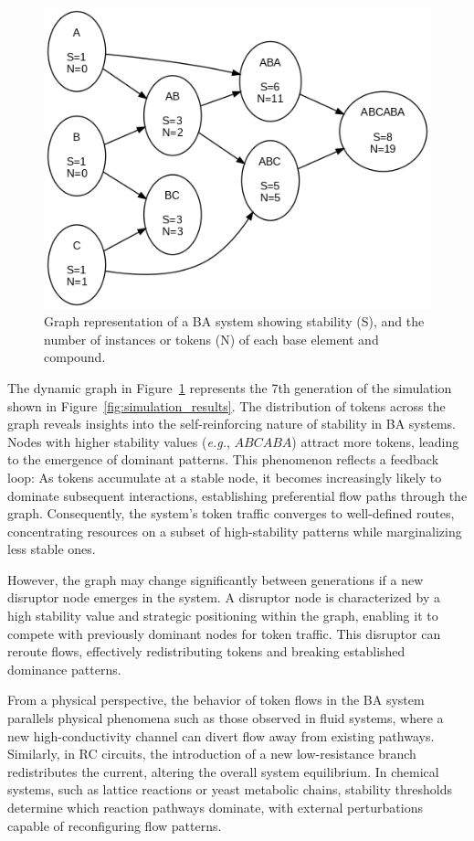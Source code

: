 \documentclass[entropy,article,submit,pdftex,oneauthor]{Definitions/mdpi}
\begin{document}
\begin{figure}[h]
    \centering
    \includegraphics[width=0.5\linewidth]{abc_graph.png}
    \caption{Graph representation of a BA system showing stability (S), and the number of instances or tokens (N) of each base element and compound.}
    \label{fig:abc_sim}
\end{figure}

The dynamic graph in Figure~\ref{fig:abc_sim} represents the 7th generation of the simulation shown in Figure~\ref{fig:simulation_results}. The distribution of tokens across the graph reveals insights into the self-reinforcing nature of stability in BA systems. Nodes with higher stability values (\textit{e.g.}, $ABCABA$) attract more tokens, leading to the emergence of dominant patterns. This phenomenon reflects a feedback loop: As tokens accumulate at a stable node, it becomes increasingly likely to dominate subsequent interactions, establishing preferential flow paths through the graph. Consequently, the system's token traffic converges to well-defined routes, concentrating resources on a subset of high-stability patterns while marginalizing less stable ones.

However, the graph may change significantly between generations if a new disruptor node emerges in the system. A disruptor node is characterized by a high stability value and strategic positioning within the graph, enabling it to compete with previously dominant nodes for token traffic. This disruptor can reroute flows, effectively redistributing tokens and breaking established dominance patterns. 

From a physical perspective, the behavior of token flows in the BA system parallels physical phenomena such as those observed in fluid systems, where a new high-conductivity channel can divert flow away from existing pathways. Similarly, in RC circuits, the introduction of a new low-resistance branch redistributes the current, altering the overall system equilibrium. In chemical systems, such as lattice reactions or yeast metabolic chains, stability thresholds determine which reaction pathways dominate, with external perturbations capable of reconfiguring flow patterns.
\end{document}
